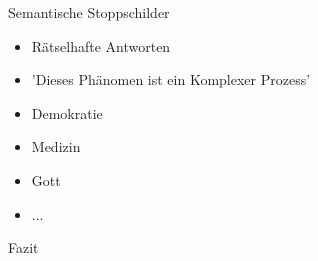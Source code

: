 \begin{frame}[c]{Semantische Stoppschilder}
    \Large
    \begin{itemize}[<+->]
    \item Rätselhafte Antworten
    \newline
    \item 'Dieses Phänomen ist ein Komplexer Prozess'
    \newline
    \item Demokratie
    \newline
    \item Medizin
    \newline
    \item Gott
    \newline
    \item ...
    \end{itemize}
\end{frame}




\begin{frame}[standout]
    Fazit
\end{frame}


